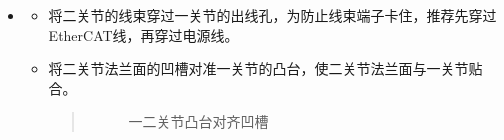 \documentclass[a4paper,11pt,english,openany,oneside]{sphinxmanual}
\begin{document}
\begin{itemize}
\begin{itemize}
\item {} 
\sphinxAtStartPar
将线圈固定件套在线束热缩管上，并将线圈固定钣金置于散热器上的钣金安装位置上。
\begin{quote}

\begin{figure}[H]
\centering
\capstart

\noindent{}
\caption{安装线圈固定件}\label{\detokenize{_u66f4_u6362_u5173_u8282:id47}}\end{figure}
\end{quote}

\item {} 
\sphinxAtStartPar
将1颗M3内六角螺钉穿过扎线固定座，并将其置于线圈固定钣金上，使用2.5mm内六角螺丝刀拧紧这颗螺钉。
\begin{quote}

\begin{figure}[H]
\centering
\capstart

\noindent{}
\caption{安装扎线固定座}\label{\detokenize{_u66f4_u6362_u5173_u8282:id48}}\end{figure}
\end{quote}

\item {} 
\sphinxAtStartPar
使用扎带将线圈固定件上方的热缩管扎上，使用斜口钳将多余扎带剪掉，注意剪扎带时切勿剪到线束。

\end{itemize}

\item {} 
\sphinxAtStartPar
{}
\begin{itemize}
\item {} 
\sphinxAtStartPar
将二关节的线束穿过一关节的出线孔，为防止线束端子卡住，推荐先穿过EtherCAT线，再穿过电源线。

\item {} 
\sphinxAtStartPar
将二关节法兰面的凹槽对准一关节的凸台，使二关节法兰面与一关节贴合。
\begin{quote}

\begin{figure}[H]
\centering
\capstart

\noindent{}
\caption{一二关节凸台对齐凹槽}\label{\detokenize{_u66f4_u6362_u5173_u8282:id49}}\end{figure}
\end{quote}


\end{itemize}
\end{itemize}
\end{document}
